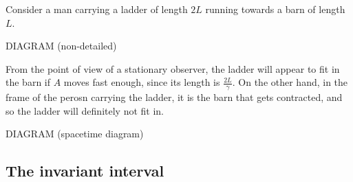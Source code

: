 \documentclass{../template/note}
\begin{document}
    \begin{example*}
        Consider a man carrying a ladder of length \(2L\) running towards a barn of length \(L\).

        DIAGRAM (non-detailed)

        From the point of view of a stationary observer, the ladder will appear to fit in the barn if \(A\) moves fast enough, since its length is \(\frac{2L}{\gamma}\). On the other hand, in the frame of the perosn carrying the ladder, it is the barn that gets contracted, and so the ladder will definitely not fit in.

        DIAGRAM (spacetime diagram)
    \end{example*}
    
    \subsection{The invariant interval}
\end{document}
